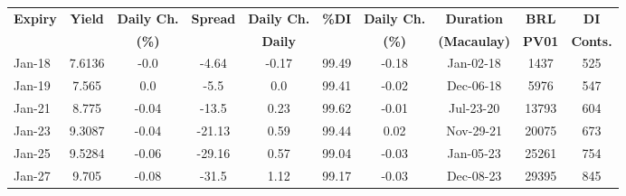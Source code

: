 \documentclass[article,crop=false]{standalone}%
\begin{document}
%
\normalsize%
\setlength{\tabcolsep}{0.15cm}%
\begin{tabular}[h]{l|c c|c c|c c|c c c}%
\hline%
\rowcolor{white}%
\textbf{Expiry}&\textbf{Yield}&\textbf{Daily Ch.}&\textbf{Spread}&\textbf{Daily Ch.}&\textbf{\%DI}&\textbf{Daily Ch.}&\textbf{Duration}&\textbf{BRL}&\textbf{DI}\\%
\rowcolor{white}%
\textbf{}&\textbf{}&\textbf{(\%)}&\textbf{}&\textbf{Daily}&\textbf{}&\textbf{(\%)}&\textbf{(Macaulay)}&\textbf{PV01}&\textbf{Conts.}\\%
\hline%
\rowcolor{lightgray}%
Jan{-}18&7.6136&{-}0.0&{-}4.64&{-}0.17&99.49&{-}0.18&Jan{-}02{-}18&1437&525\\%
\rowcolor{white}%
Jan{-}19&7.565&0.0&{-}5.5&0.0&99.41&{-}0.02&Dec{-}06{-}18&5976&547\\%
\rowcolor{lightgray}%
Jan{-}21&8.775&{-}0.04&{-}13.5&0.23&99.62&{-}0.01&Jul{-}23{-}20&13793&604\\%
\rowcolor{white}%
Jan{-}23&9.3087&{-}0.04&{-}21.13&0.59&99.44&0.02&Nov{-}29{-}21&20075&673\\%
\rowcolor{lightgray}%
Jan{-}25&9.5284&{-}0.06&{-}29.16&0.57&99.04&{-}0.03&Jan{-}05{-}23&25261&754\\%
\rowcolor{white}%
Jan{-}27&9.705&{-}0.08&{-}31.5&1.12&99.17&{-}0.03&Dec{-}08{-}23&29395&845\\%
\hline%
\end{tabular}%
\end{document}
